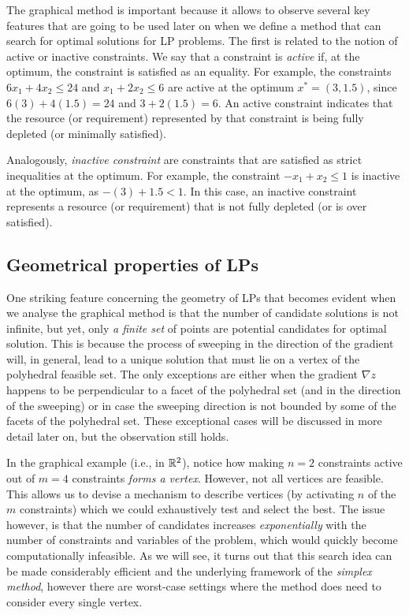 The graphical method is important because it allows to observe several key features that are going to be used later on when we define a method that can search for optimal solutions for LP problems. The first is related to the notion of active or inactive constraints. We say that a constraint is \emph{active} if, at the optimum, the constraint is satisfied as an equality. For example, the constraints $6x_1 + 4x_2 \leq 24$ and $x_1 + 2x_2 \leq 6$ are active at the optimum $x^* = (3, 1.5)$, since $6(3) + 4(1.5) = 24$ and $3 + 2(1.5) = 6$. An active constraint indicates that the resource (or requirement) represented by that constraint is being fully depleted (or minimally satisfied). 

Analogously, \emph{inactive constraint} are constraints that are satisfied as strict inequalities at the optimum. For example, the constraint $-x_1 + x_2 \leq 1$ is inactive at the optimum, as $-(3) + 1.5 < 1$. In this case, an inactive constraint represents a resource (or requirement) that is not fully depleted (or is over satisfied).


\subsection{Geometrical properties of LPs}

One striking feature concerning the geometry of LPs that becomes evident when we analyse the graphical method is that the number of candidate solutions is not infinite, but yet, only \emph{a finite set} of points are potential candidates for optimal solution. This is because the process of sweeping in the direction of the gradient will, in general, lead to a unique solution that must lie on a vertex of the polyhedral feasible set. The only exceptions are either when the gradient $\nabla z$ happens to be perpendicular to a facet of the polyhedral set (and in the direction of the sweeping) or in case the sweeping direction is not bounded by some of the facets of the polyhedral set. These exceptional cases will be discussed in more detail later on, but the observation still holds.

In the graphical example (i.e., in $\mathbb{R}^2$), notice how making $n = 2$ constraints active out of $m = 4$ constraints \emph{forms a vertex}. However, not all vertices are feasible. This allows us to devise a mechanism to describe vertices (by activating $n$ of the $m$ constraints) which we could exhaustively test and select the best. The issue however, is that the number of candidates increases \emph{exponentially} with the number of constraints and variables	 of the problem, which would quickly become computationally infeasible. As we will see, it turns out that this search idea can be made considerably efficient and the underlying framework of the \emph{simplex method}, however there are worst-case settings where the method does need to consider every single vertex.

